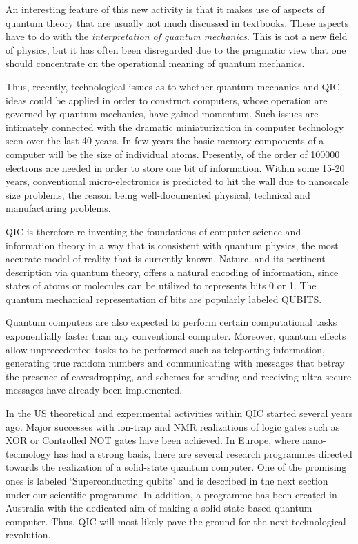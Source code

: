 An interesting feature of this new
activity is that it makes use of aspects of quantum theory that are
usually not much discussed in textbooks. These aspects have to do with
the {\em interpretation of quantum mechanics}. This is not a new field of
physics, but it has often been disregarded due to the pragmatic view that
one should concentrate on the operational meaning of quantum mechanics.

Thus, recently, technological issues as to whether quantum mechanics
and QIC ideas could be applied in order to construct computers,
whose operation are governed by quantum mechanics, have gained
momentum. Such issues are intimately connected with
the  dramatic miniaturization
in computer technology seen over the last 40 years.
In few years the basic memory components
of a computer will be the size of individual atoms.
Presently, of the order of 100000 electrons are needed in order
to store one bit of information. Within some 15-20 years,
conventional micro-electronics is predicted to
hit the wall due to nanoscale size problems, the reason being
well-documented physical, technical and manufacturing
problems.

QIC is therefore re-inventing the foundations of
computer science and information theory in a way
that is consistent with quantum physics, the most accurate
model of reality that is currently known.
Nature, and its pertinent description via quantum theory,
offers a natural encoding of information, since states
of atoms or molecules can be utilized to represents
bits 0 or 1. The quantum mechanical representation of
bits are popularly labeled QUBITS.

Quantum computers are also expected to perform
certain computational tasks exponentially faster than any
conventional computer. Moreover, quantum effects
allow unprecedented tasks to be performed such as
teleporting information, generating true random numbers and
communicating with messages that betray the presence of
eavesdropping, and schemes for sending and receiving
ultra-secure messages have already been implemented.

In the US theoretical and experimental activities within QIC started
several years ago.  Major successes with ion-trap and NMR realizations
of logic gates such as XOR or Controlled NOT gates have been
achieved. In Europe, where nano-technology has had a strong basis,
there are several research programmes directed towards the realization
of a solid-state quantum computer. One of the promising ones is
labeled `Superconducting qubits' and is described in the next section
under our scientific programme.  In addition, a programme has been
created in Australia with the dedicated aim of making a solid-state
based quantum computer. Thus, QIC will most likely pave the ground for
the next technological revolution.


